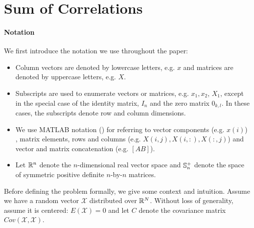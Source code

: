\section{Sum of Correlations}\label{sec:sumcor}
\paragraph{Notation}
We first introduce the notation we use throughout the paper:
\begin{itemize}
\item Column vectors are denoted by lowercase
letters, e.g. $x$ and matrices are denoted by uppercase letters,
e.g. $X$.
\item Subscripts are used to
enumerate vectors or matrices, e.g. $x_1, x_2$, $X_1$, except in the
special case of the identity matrix, $I_n$ and the zero matrix $0_{k,l}$.
In these cases, the subscripts
denote row and column dimensions.
\item We use MATLAB notation (\cite{golub})%
for referring to vector components (e.g. $x(i)$) , matrix elements, rows and columns {(e.g. ${X(i,j), X(i,:), X(:,j)}$)} and vector and matrix concatenation (e.g. $[A B]$).
\item Let $\mathbb{R}^n$ denote the
$n$-dimensional
real vector space %
 and $\mathbb{S}_n^{+}$ denote the space of symmetric positive definite $n$-by-$n$ matrices.
\end{itemize}
\vspace{-0.1cm}

Before defining  the problem formally, we  give some context and intuition.  Assume we have a random vector $\mathcal{X}$
distributed over $\mathbb{R}^N$. Without loss of generality, assume it is
centered: $E\left(\mathcal{X}\right) = 0$ and let
$C$ denote the covariance matrix  $Cov\left(\mathcal{X}, \mathcal{X}\right)$. %


